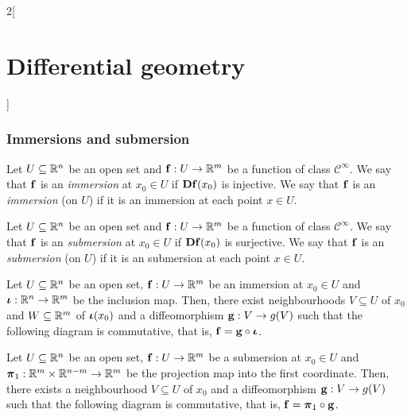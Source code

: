 \documentclass[../../../main.tex]{subfiles}
\begin{document}
\begin{multicols}{2}[\section{Differential geometry}]
  \subsubsection{Immersions and submersion}
  \begin{definition}[Immersion]
    Let $U\subseteq\mathbb{R}^n$ be an open set and $\boldsymbol{\mathrm{f}}:U\rightarrow \mathbb{R}^m$ be a function of class $\mathcal{C}^\infty$. We say that $\boldsymbol{\mathrm{f}}$ is an \emph{immersion} at $x_0\in U$ if $\boldsymbol{\mathrm{Df}}(x_0)$ is injective. We say that $\boldsymbol{\mathrm{f}}$ is an \emph{immersion} (on $U$) if it is an immersion at each point $x\in U$.
  \end{definition}
  \begin{definition}[Submersion]
    Let $U\subseteq\mathbb{R}^n$ be an open set and $\boldsymbol{\mathrm{f}}:U\rightarrow \mathbb{R}^m$ be a function of class $\mathcal{C}^\infty$. We say that $\boldsymbol{\mathrm{f}}$ is an \emph{submersion} at $x_0\in U$ if $\boldsymbol{\mathrm{Df}}(x_0)$ is surjective. We say that $\boldsymbol{\mathrm{f}}$ is an \emph{submersion} (on $U$) if it is an submersion at each point $x\in U$.
  \end{definition}
  \begin{theorem}
    Let $U\subseteq\mathbb{R}^n$ be an open set, $\boldsymbol{\mathrm{f}}:U\rightarrow \mathbb{R}^m$ be an immersion at $x_0\in U$ and $\boldsymbol{\mathrm{\iota}}:\mathbb{R}^n\rightarrow\mathbb{R}^m$ be the inclusion map. Then, there exist neighbourhoods $V\subseteq U$ of $x_0$ and $W\subseteq\mathbb{R}^m$ of $\boldsymbol{\mathrm{\iota}}(x_0)$ and a diffeomorphism $\boldsymbol{\mathrm{g}}:V\rightarrow g(V)$ such that the following diagram is commutative, that is, $\boldsymbol{\mathrm{f}}=\boldsymbol{\mathrm{g}}\circ\boldsymbol{\mathrm{\iota}}$.
    \begin{center}
      \begin{minipage}{\linewidth}
        \centering
        
      \end{minipage}
    \end{center}
  \end{theorem}
  \begin{theorem}
    Let $U\subseteq\mathbb{R}^n$ be an open set, $\boldsymbol{\mathrm{f}}:U\rightarrow \mathbb{R}^m$ be a submersion at $x_0\in U$ and $\boldsymbol{\mathrm{\pi}}_1:\mathbb{R}^m\times\mathbb{R}^{n-m}\rightarrow\mathbb{R}^m$ be the projection map into the first coordinate. Then, there exists a neighbourhood $V\subseteq U$ of $x_0$ and a diffeomorphism $\boldsymbol{\mathrm{g}}:V\rightarrow g(V)$ such that the following diagram is commutative, that is, $\boldsymbol{\mathrm{f}}=\boldsymbol{\mathrm{\pi}}_1\circ\boldsymbol{\mathrm{g}}$.
    \begin{center}
      \begin{minipage}{\linewidth}
        \centering
        
      \end{minipage}
    \end{center}
  \end{theorem}

\end{multicols}
\end{document}
